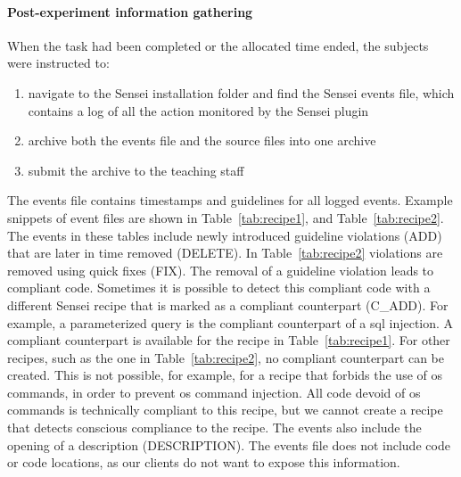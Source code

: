 \paragraph{Post-experiment information gathering}
\label{sec:after}
When the task had been completed or the allocated time ended, the subjects were instructed to:

\begin{enumerate}[noitemsep]
    \item navigate to the Sensei installation folder and find the Sensei events file, which contains a log of all the action monitored by the Sensei plugin
    \item archive both the events file and the source files into one archive
    \item submit the archive to the teaching staff
\end{enumerate}

The events file contains timestamps and guidelines for all logged events.
Example snippets of event files are shown in Table~\ref{tab:recipe1}, and Table~\ref{tab:recipe2}.
The events in these tables include newly introduced guideline violations (ADD) that are later in time removed (DELETE).
In Table~\ref{tab:recipe2} violations are removed using quick fixes (FIX).
The removal of a guideline violation leads to compliant code.
Sometimes it is possible to detect this compliant code with a different Sensei recipe that is marked as a compliant counterpart (C\_ADD).
For example, a parameterized query is the compliant counterpart of a \gls{sql} injection.
A compliant counterpart is available for the recipe in Table~\ref{tab:recipe1}.
For other recipes, such as the one in Table~\ref{tab:recipe2}, no compliant counterpart can be created.
This is not possible, for example, for a recipe that forbids the use of \gls{os} commands, in order to prevent \gls{os} command injection.
All code devoid of \gls{os} commands is technically compliant to this recipe, but we cannot create a recipe that detects conscious compliance to the recipe.
The events also include the opening of a description (DESCRIPTION).
The events file does not include code or code locations, as our clients do not want to expose this information.

